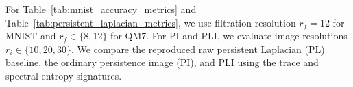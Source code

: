 \documentclass{article}
\begin{document}





For Table~\ref{tab:mnist_accuracy_metrics} and Table~\ref{tab:persistent_laplacian_metrics}, we use filtration resolution \(r_f=12\) for MNIST and \(r_f\in\{8,12\}\) for QM7. For PI and PLI, we evaluate image resolutions \(r_i\in\{10,20,30\}\). We compare the reproduced raw persistent Laplacian (PL) baseline, the ordinary persistence image (PI), and PLI using the trace and spectral-entropy signatures.
\end{document}
